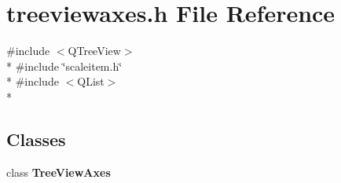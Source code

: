 \section{treeviewaxes.\+h File Reference}
\label{treeviewaxes_8h}
{\ttfamily \#include $<$Q\+Tree\+View$>$}\\*
{\ttfamily \#include \char`\"{}scaleitem.\+h\char`\"{}}\\*
{\ttfamily \#include $<$Q\+List$>$}\\*
\subsection*{Classes}
\begin{DoxyCompactItemize}
\item 
class {\bf Tree\+View\+Axes}
\end{DoxyCompactItemize}
